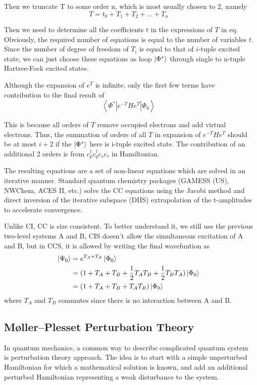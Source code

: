 Then we truncate T to some order n, which is most usually chosen to 2, namely
$$
T=t_0+T_1+T_2+ \dots +T_n
$$

Then we need to determine all the coefficients $t$ in the expressions of $T$ in eq.
Obviously, the required number of equations is equal to the number of variables $t$.
Since the number of degree of freedom of $T_i$ is equal to that of $i$-tuple excited state, we can just choose these equations as loop $\ket{\Phi^{*}}$ through single to n-tuple Hartree-Fock excited states.

Although the expansion of $e^T$ is infinite, only the first few terms have contribution to the final result of 
$$
\left\langle\Phi^{*}\left|e^{-T} H e^{T}\right| \Phi_{0}\right\rangle
$$

This is because all orders of $T$ remove occupied electrons and add virtual electrons.
Thus, the summation of orders of all $T$ in expansion of $e^{-T} H e^{T}$ should be at most $i+2$ if the $\ket{\Phi^{*}}$ here is i-tuple excited state.
The contribution of an additional 2 orders is from $c_{p}^{\dagger} c_{q}^{\dagger} c_{s} c_{r}$ in Hamiltonian.

The resulting equations are a set of non-linear equations which are solved in an iterative manner. 
Standard quantum chemistry packages (GAMESS (US), NWChem, ACES II, etc.) solve the CC equations using the Jacobi method and direct inversion of the iterative subspace (DIIS) extrapolation of the t-amplitudes to accelerate convergence.

Unlike CI, CC is size consistent.
To better understand it, we still use the previous two-level systems A and B, CIS doesn't allow the simultaneous excitation of A and B, but in CCS, it is allowed by writing the final wavefuntion as 
\begin{align*}
	\ket{\Psi_0}&=e^{T_A+T_B}\ket{\Phi_0}
	\\
	&=(1+T_A+T_B+\frac{1}{2}T_AT_B+\frac{1}{2}T_BT_A)\ket{\Phi_0}
	\\
	&=(1+T_A+T_B+T_AT_B)\ket{\Phi_0}
\end{align*}
where $T_A$ and $T_B$ commutes since there is no interaction between A and B.

\subsection{M{\o}ller–Plesset Perturbation Theory}
In quantum mechanics, a common way to describe complicated quantum system is perturbation theory approach.
The idea is to start with a simple unperturbed Hamiltonian for which a mathematical solution is known, and add an additional perturbed Hamiltonian representing a weak disturbance to the system.

